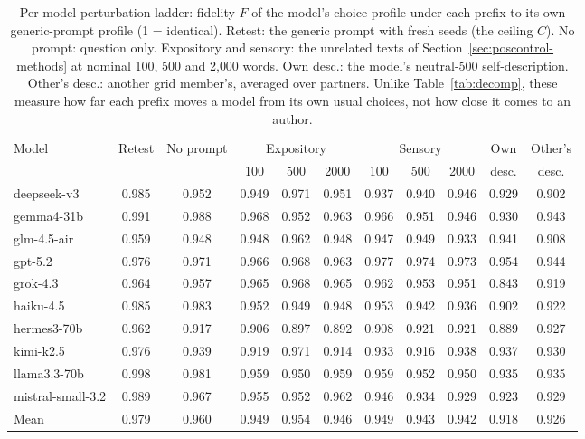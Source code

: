 \begin{table}[H]
\centering\scriptsize\setlength{\tabcolsep}{3pt}
\begin{tabular}{lcccccccccc}
\toprule
Model & Retest & No prompt & \multicolumn{3}{c}{Expository} & \multicolumn{3}{c}{Sensory} & Own & Other's \\
\cmidrule(lr){4-6} \cmidrule(lr){7-9}
 & & & 100 & 500 & 2000 & 100 & 500 & 2000 & desc. & desc. \\
\midrule
deepseek-v3 & 0.985 & 0.952 & 0.949 & 0.971 & 0.951 & 0.937 & 0.940 & 0.946 & 0.929 & 0.902 \\
gemma4-31b & 0.991 & 0.988 & 0.968 & 0.952 & 0.963 & 0.966 & 0.951 & 0.946 & 0.930 & 0.943 \\
glm-4.5-air & 0.959 & 0.948 & 0.948 & 0.962 & 0.948 & 0.947 & 0.949 & 0.933 & 0.941 & 0.908 \\
gpt-5.2 & 0.976 & 0.971 & 0.966 & 0.968 & 0.963 & 0.977 & 0.974 & 0.973 & 0.954 & 0.944 \\
grok-4.3 & 0.964 & 0.957 & 0.965 & 0.968 & 0.965 & 0.962 & 0.953 & 0.951 & 0.843 & 0.919 \\
haiku-4.5 & 0.985 & 0.983 & 0.952 & 0.949 & 0.948 & 0.953 & 0.942 & 0.936 & 0.902 & 0.922 \\
hermes3-70b & 0.962 & 0.917 & 0.906 & 0.897 & 0.892 & 0.908 & 0.921 & 0.921 & 0.889 & 0.927 \\
kimi-k2.5 & 0.976 & 0.939 & 0.919 & 0.971 & 0.914 & 0.933 & 0.916 & 0.938 & 0.937 & 0.930 \\
llama3.3-70b & 0.998 & 0.981 & 0.959 & 0.950 & 0.959 & 0.959 & 0.952 & 0.950 & 0.935 & 0.935 \\
mistral-small-3.2 & 0.989 & 0.967 & 0.955 & 0.952 & 0.962 & 0.946 & 0.934 & 0.929 & 0.923 & 0.929 \\
\midrule
Mean & 0.979 & 0.960 & 0.949 & 0.954 & 0.946 & 0.949 & 0.943 & 0.942 & 0.918 & 0.926 \\
\bottomrule
\end{tabular}
\caption{Per-model perturbation ladder: fidelity $F$ of the model's choice profile under each prefix to its own generic-prompt profile (1 = identical). Retest: the generic prompt with fresh seeds (the ceiling $C$). No prompt: question only. Expository and sensory: the unrelated texts of Section~\ref{sec:poscontrol-methods} at nominal 100, 500 and 2{,}000 words. Own desc.: the model's neutral-500 self-description. Other's desc.: another grid member's, averaged over partners. Unlike Table~\ref{tab:decomp}, these measure how far each prefix moves a model from its own usual choices, not how close it comes to an author.}
\label{tab:self-ladder}
\end{table}
